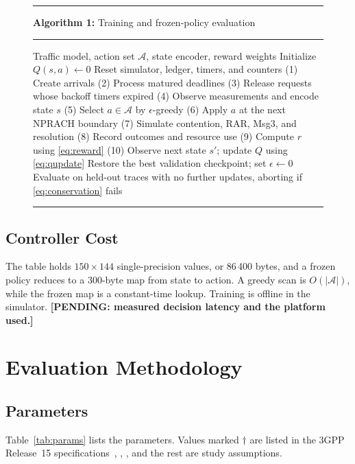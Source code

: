 \documentclass[conference]{IEEEtran}
\newcommand{\pending}[1]{\textbf{[PENDING: #1]}}
\begin{document}
\begin{figure}[!t]
\footnotesize
\hrule\smallskip
\textbf{Algorithm 1:} Training and frozen-policy evaluation
\smallskip\hrule\smallskip
\begin{algorithmic}[0]
\REQUIRE Traffic model, action set $\mathcal{A}$, state encoder, reward weights
\STATE Initialize $Q(s,a) \leftarrow 0$
  \STATE Reset simulator, ledger, timers, and counters
    \STATE (1) Create arrivals
    \STATE (2) Process matured deadlines
    \STATE (3) Release requests whose backoff timers expired
    \STATE (4) Observe measurements and encode state $s$
    \STATE (5) Select $a \in \mathcal{A}$ by $\epsilon$-greedy
    \STATE (6) Apply $a$ at the next NPRACH boundary
    \STATE (7) Simulate contention, RAR, Msg3, and resolution
    \STATE (8) Record outcomes and resource use
    \STATE (9) Compute $r$ using \eqref{eq:reward}
    \STATE (10) Observe next state $s'$; update $Q$ using \eqref{eq:qupdate}
  \ENDWHILE
\ENDFOR
\STATE Restore the best validation checkpoint; set $\epsilon \leftarrow 0$
\STATE Evaluate on held-out traces with no further updates, aborting if
\eqref{eq:conservation} fails
\end{algorithmic}
\smallskip\hrule
\end{figure}

\subsection{Controller Cost}
The table holds $150 \times 144$ single-precision values, or 86\,400 bytes, and a
frozen policy reduces to a 300-byte map from state to action. A greedy scan is
$O(|\mathcal{A}|)$, while the frozen map is a constant-time lookup. Training is
offline in the simulator. \pending{measured decision latency and the platform used.}

\section{Evaluation Methodology}
\label{sec:evaluation}
\subsection{Parameters}
Table~\ref{tab:params} lists the parameters. Values marked $\dagger$ are listed in
the 3GPP Release~15 specifications~\cite{ts36331}, \cite{ts36321}, \cite{ts36211},
and the rest are study assumptions.
\end{document}
